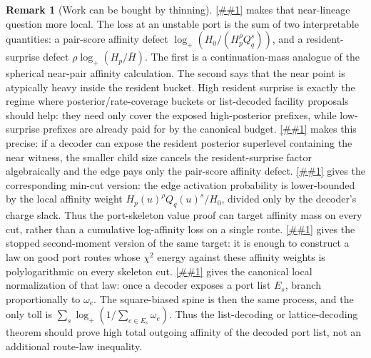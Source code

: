 \documentclass[10pt]{article}
\newcommand{\Cref}[1]{\ref{##1}}
\theoremstyle{definition}
\newtheorem{remark}[theorem]{Remark}
\begin{document}
\begin{remark}[Work can be bought by thinning]
   \Cref{lem:canonical-defect-splitting} makes that near-lineage question more
   local.  The loss at an unstable port is the sum of two interpretable
   quantities: a pair-score affinity defect
   \(\log_+(H_0/(H_p^\rho Q_q^s))\), and a resident-surprise defect
   \(\rho\log_+(H_p/\overline H)\).  The first is a continuation-mass
   analogue of the spherical near-pair affinity calculation.  The second says
   that the near point is atypically heavy inside the resident bucket.  High
   resident surprise is exactly the regime where posterior/rate-coverage
   buckets or list-decoded facility proposals should help: they need only cover
   the exposed high-posterior prefixes, while low-surprise prefixes are already
   paid for by the canonical budget.
   \Cref{lem:posterior-superlevel-cancels-surprise} makes this precise: if a
   decoder can expose the resident posterior superlevel containing the near
   witness, the smaller child size cancels the resident-surprise factor
   algebraically and the edge pays only the pair-score affinity defect.
   \Cref{cor:affinity-cut-posterior-handoff} gives the corresponding min-cut
   version: the edge activation probability is lower-bounded by the local
   affinity weight \(H_p(u)^\rho Q_q(u)^s/H_0\), divided only by the
   decoder's charge slack.  Thus the port-skeleton value proof can target
   affinity mass on every cut, rather than a cumulative log-affinity loss on a
   single route.  \Cref{cor:affinity-cut-energy} gives the stopped
   second-moment version of the same target: it is enough to construct a law
   on good port routes whose \(\chi^2\) energy against these affinity weights
   is polylogarithmic on every skeleton cut.
   \Cref{cor:affinity-proportional-route-law} gives the canonical local
   normalization of that law: once a decoder exposes a port list \(E_s\),
   branch proportionally to \(\omega_e\).  The square-biased spine is then the
   same process, and the only toll is
   \(\sum_s\log_+(1/\sum_{e\in E_s}\omega_e)\).  Thus the list-decoding or
   lattice-decoding theorem should prove high total outgoing affinity of the
   decoded port list, not an additional route-law inequality.
\end{remark}
\end{document}
